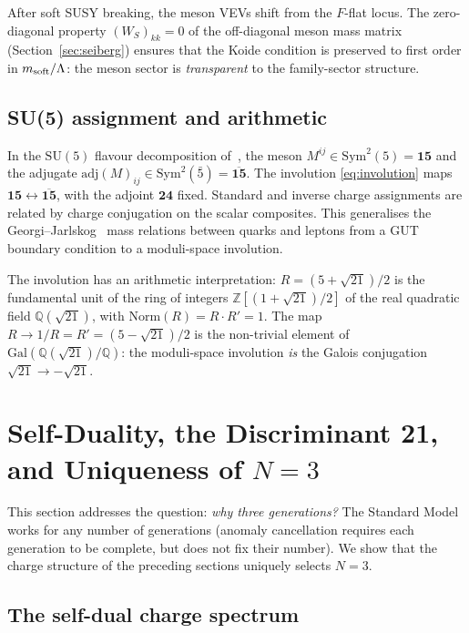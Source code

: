 \documentclass[12pt,a4paper]{article}
\newcommand{\SU}{\mathrm{SU}}
\newcommand{\adj}{\mathrm{adj}}
\begin{document}
After soft SUSY breaking, the meson VEVs shift from the
$F$-flat locus. The zero-diagonal property $(W_S)_{kk} = 0$ of the
off-diagonal meson mass matrix (Section~\ref{sec:seiberg}) ensures
that the Koide condition is preserved to first order in
$m_{\rm soft}/\Lambda$: the meson sector is \emph{transparent} to the
family-sector structure.

\subsection{SU(5) assignment and arithmetic}

In the $\SU(5)$ flavour decomposition of~\cite{Rivero:2024epjc}, the
meson $M^{ij} \in \mathrm{Sym}^2(5) = \mathbf{15}$ and the adjugate
$\adj(M)_{ij} \in \mathrm{Sym}^2(\bar 5) =
\overline{\mathbf{15}}$. The involution \eqref{eq:involution} maps
$\mathbf{15} \leftrightarrow \overline{\mathbf{15}}$, with the
adjoint $\mathbf{24}$ fixed. Standard and inverse charge assignments
are related by charge conjugation on the scalar composites.
This generalises the Georgi--Jarlskog~\cite{GeorgiJarlskog:1979}
mass relations between quarks and leptons from a GUT boundary condition
to a moduli-space involution.

The involution has an arithmetic interpretation: $R = (5+\sqrt{21})/2$
is the fundamental unit of the ring of integers
$\mathbb{Z}[(1+\sqrt{21})/2]$ of the real quadratic field
$\mathbb{Q}(\sqrt{21})$, with $\mathrm{Norm}(R) = R\cdot R' = 1$.
The map $R \to 1/R = R' = (5-\sqrt{21})/2$ is the non-trivial element
of $\mathrm{Gal}(\mathbb{Q}(\sqrt{21})/\mathbb{Q})$: the moduli-space
involution \emph{is} the Galois conjugation $\sqrt{21}\to -\sqrt{21}$.


\section{Self-Duality, the Discriminant 21, and Uniqueness of $N=3$}
\label{sec:uniqueness}

This section addresses the question: \emph{why three generations?}
The Standard Model works for any number of generations
(anomaly cancellation requires each generation to be complete, but
does not fix their number). We show that the charge structure of
the preceding sections uniquely selects $N = 3$.

\subsection{The self-dual charge spectrum}
\end{document}
